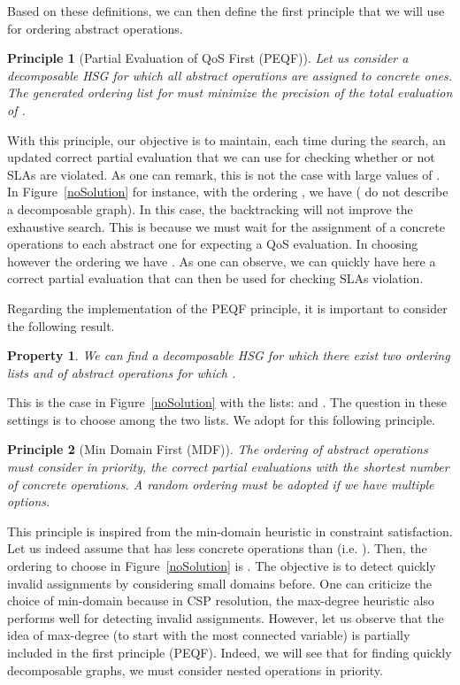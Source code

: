 \documentclass[a4paper]{article}
\newtheorem{principle}{Principle}
\newtheorem{property}{Property}
\begin{document}
Based on these definitions, we can then define the first principle that we will use for 
ordering abstract operations.


\begin{principle}[Partial Evaluation of QoS First (PEQF)]
Let us consider a decomposable HSG  for which all abstract operations are assigned to 
concrete ones. The generated ordering list  for  must minimize the precision of the total  
evaluation of .
\end{principle}

With this principle, our objective is to maintain, each time during the search, an updated correct 
partial evaluation that we can use for checking whether or not SLAs are violated. As one can remark, this 
is not the case with large values of . 
In Figure~\ref{noSolution} for instance, with the ordering , we have  ( 
 do not describe a decomposable graph). In this case, the backtracking will 
not improve the exhaustive search. This is because we must wait for the assignment of a concrete operations to 
each abstract one for expecting a QoS evaluation. In choosing however 
the ordering  we have . As one can observe, we can 
quickly have here a correct partial evaluation that can then be used for checking SLAs violation. 

Regarding the implementation of the PEQF principle, it is important to consider the following 
result. 

\begin{property}
We can find a decomposable HSG  for which there exist two ordering lists  and  of 
abstract operations for which . 
\end{property}

This is the case in Figure~\ref{noSolution} with the lists:  
 and  . The question in these settings is to choose among the 
two lists.  We adopt for this following principle.

\begin{principle}[Min Domain First (MDF)]
The ordering of abstract operations must consider in priority, the correct partial evaluations with 
the shortest number of concrete operations. A random ordering must be adopted if we have multiple 
options. 
\end{principle}

This principle is inspired from the min-domain heuristic in constraint satisfaction. Let us indeed assume that 
 has less concrete operations than  (i.e. ). Then, the ordering to choose in Figure~\ref{noSolution} 
is .
The objective is to detect quickly invalid assignments by considering small domains before. One can 
criticize the choice of min-domain because in CSP resolution, the max-degree heuristic  
also performs well for detecting invalid assignments. However, let us observe that the idea of 
max-degree (to start with the most connected variable) is partially included in the first principle (PEQF). 
Indeed, we will see that for finding quickly decomposable graphs, we must consider nested operations in priority. 
\end{document}
